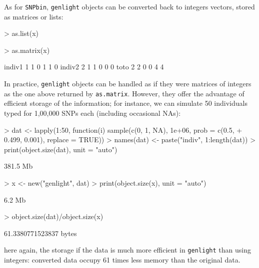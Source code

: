 \documentclass{article}
\begin{document}
As for \texttt{SNPbin}, \texttt{genlight} objects can be converted back to integers vectors, stored
as matrices or lists:
\begin{Schunk}
\begin{Sinput}
> as.list(x)
\end{Sinput}
\begin{Sinput}
> as.matrix(x)
\end{Sinput}
\begin{Soutput}
       [,1] [,2] [,3] [,4] [,5] [,6]
indiv1    1    1    0    1    1    0
indiv2    2    1    1    0    0    0
toto      2    2    0    0    4    4
\end{Soutput}
\end{Schunk}

\noindent In practice, \texttt{genlight} objects can be handled as if they were matrices of integers
as the one above returned by \texttt{as.matrix}.
However, they offer the advantage of efficient storage of the information; for instance, we can
simulate 50 individuals typed for 1,00,000 SNPs each (including occasional NAs):
\begin{Schunk}
\begin{Sinput}
> dat <- lapply(1:50, function(i) sample(c(0, 1, NA), 1e+06, prob = c(0.5, 
+     0.499, 0.001), replace = TRUE))
> names(dat) <- paste("indiv", 1:length(dat))
> print(object.size(dat), unit = "auto")
\end{Sinput}
\begin{Soutput}
381.5 Mb
\end{Soutput}
\begin{Sinput}
> x <- new("genlight", dat)
> print(object.size(x), unit = "auto")
\end{Sinput}
\begin{Soutput}
6.2 Mb
\end{Soutput}
\begin{Sinput}
> object.size(dat)/object.size(x)
\end{Sinput}
\begin{Soutput}
61.3380771523837 bytes
\end{Soutput}
\end{Schunk}
here again, the storage if the data is much more efficient in \texttt{genlight} than using integers: converted data occupy
61 times less memory than the original data.
\\
\end{document}

